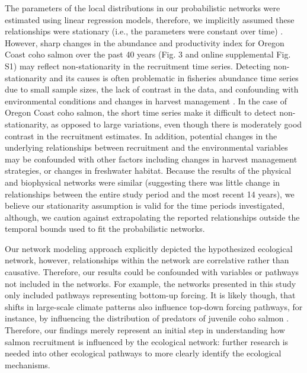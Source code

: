 The parameters of the local distributions in our probabilistic networks were
estimated using linear regression models, therefore, we implicitly assumed these
relationships were stationary (i.e., the parameters were constant over time)
\citep{Walters1987a}. However, sharp changes in the abundance and productivity
index for Oregon Coast coho salmon over the past 40 years (Fig. 3 and online
supplemental Fig. S1) may reflect non-stationarity in the recruitment time
series. Detecting non-stationarity and its causes is often problematic in
fisheries abundance time series due to small sample sizes, the lack of contrast
in the data, and confounding with environmental conditions and changes in
harvest management \citep{Walters1987a, Peterman2009a}. In the case of Oregon
Coast coho salmon, the short time series make it difficult to detect
non-stationarity, as opposed to large variations, even though there is
moderately good contrast in the recruitment estimates. In addition, potential
changes in the underlying relationships between recruitment and the
environmental variables may be confounded with other factors including changes
in harvest management strategies, or changes in freshwater habitat. Because the
results of the physical and biophysical networks were similar (suggesting there
was little change in relationships between the entire study period and the most
recent 14 years), we believe our stationarity assumption is valid for the time
periods investigated, although, we caution against extrapolating the reported
relationships outside the temporal bounds used to fit the probabilistic
networks.

Our network modeling approach explicitly depicted the hypothesized ecological
network, however, relationships within the network are correlative rather than
causative. Therefore, our results could be confounded with variables or pathways
not included in the networks. For example, the networks presented in this study
only included pathways representing bottom-up forcing. It is likely though, that
shifts in large-scale climate patterns also influence top-down forcing pathways,
for instance, by influencing the distribution of predators of juvenile coho
salmon \citep{Pearcy2002a, Perry2005a}. Therefore, our findings merely represent
an initial step in understanding how salmon recruitment is influenced by the
ecological network: further research is needed into other ecological pathways to
more clearly identify the ecological mechanisms.

